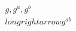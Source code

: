 \documentclass[preview]{standalone}
\begin{document}
\begin{align*}
g, g^a, g^b \\longrightarrow g^{ab}
\end{align*}
\end{document}
